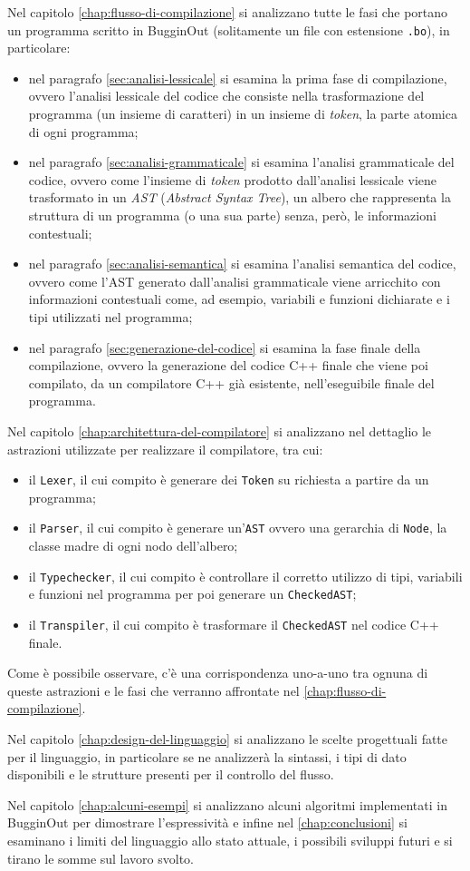 Nel capitolo \ref{chap:flusso-di-compilazione} si analizzano tutte le fasi che portano un programma scritto in BugginOut (solitamente un file con estensione \texttt{.bo}), in particolare:
\begin{itemize}
	\item nel paragrafo \ref{sec:analisi-lessicale} si esamina la prima fase di compilazione, ovvero l'analisi lessicale del codice che consiste nella trasformazione del programma (un insieme di caratteri) in un insieme di \textit{token}, la parte atomica di ogni programma;
	\item nel paragrafo \ref{sec:analisi-grammaticale} si esamina l'analisi grammaticale del codice, ovvero come l'insieme di \textit{token} prodotto dall'analisi lessicale viene trasformato in un \textit{AST} (\textit{Abstract Syntax Tree}), un albero che rappresenta la struttura di un programma (o una sua parte) senza, per\`o, le informazioni contestuali;
	\item nel paragrafo \ref{sec:analisi-semantica} si esamina l'analisi semantica del codice, ovvero come l'AST generato dall'analisi grammaticale viene arricchito con informazioni contestuali come, ad esempio, variabili e funzioni dichiarate e i tipi utilizzati nel programma;
	\item nel paragrafo \ref{sec:generazione-del-codice} si esamina la fase finale della compilazione, ovvero la generazione del codice C++ finale che viene poi compilato, da un compilatore C++ gi\`a esistente, nell'eseguibile finale del programma.
\end{itemize}
Nel capitolo \ref{chap:architettura-del-compilatore} si analizzano nel dettaglio le astrazioni utilizzate per realizzare il compilatore, tra cui:
\begin{itemize}
	\item il \texttt{Lexer}, il cui compito \`e generare dei \texttt{Token} su richiesta a partire da un programma;
	\item il \texttt{Parser}, il cui compito \`e generare un'\texttt{AST} ovvero una gerarchia di \texttt{Node}, la classe madre di ogni nodo dell'albero;
	\item il \texttt{Typechecker}, il cui compito \`e controllare il corretto utilizzo di tipi, variabili e funzioni nel programma per poi generare un \texttt{CheckedAST};
	\item il \texttt{Transpiler}, il cui compito \`e trasformare il \texttt{CheckedAST} nel codice C++ finale.
\end{itemize}
Come \`e possibile osservare, c'\`e una corrispondenza uno-a-uno tra ognuna di queste astrazioni e le fasi che verranno affrontate nel \ref{chap:flusso-di-compilazione}.

Nel capitolo \ref{chap:design-del-linguaggio} si analizzano le scelte progettuali fatte per il linguaggio, in particolare se ne analizzer\`a la sintassi, i tipi di dato disponibili e le strutture presenti per il controllo del flusso.

Nel capitolo \ref{chap:alcuni-esempi} si analizzano alcuni algoritmi implementati in BugginOut per dimostrare l'espressivit\`a e infine nel \ref{chap:conclusioni} si esaminano i limiti del linguaggio allo stato attuale, i possibili sviluppi futuri e si tirano le somme sul lavoro svolto.
